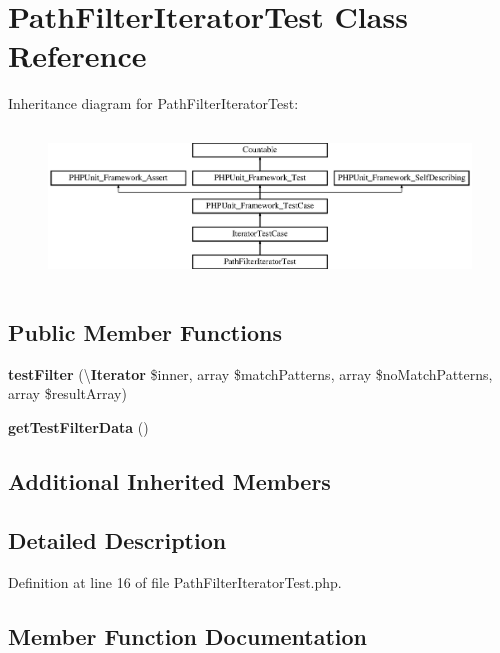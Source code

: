 \section{Path\+Filter\+Iterator\+Test Class Reference}
\label{class_symfony_1_1_component_1_1_finder_1_1_tests_1_1_iterator_1_1_path_filter_iterator_test}
Inheritance diagram for Path\+Filter\+Iterator\+Test\+:\begin{figure}[H]
\begin{center}
\leavevmode
\includegraphics[height=4.129793cm]{class_symfony_1_1_component_1_1_finder_1_1_tests_1_1_iterator_1_1_path_filter_iterator_test}
\end{center}
\end{figure}
\subsection*{Public Member Functions}
\begin{DoxyCompactItemize}
\item 
{\bf test\+Filter} (\textbackslash{}{\bf Iterator} \$inner, array \$match\+Patterns, array \$no\+Match\+Patterns, array \$result\+Array)
\item 
{\bf get\+Test\+Filter\+Data} ()
\end{DoxyCompactItemize}
\subsection*{Additional Inherited Members}


\subsection{Detailed Description}


Definition at line 16 of file Path\+Filter\+Iterator\+Test.\+php.



\subsection{Member Function Documentation}
